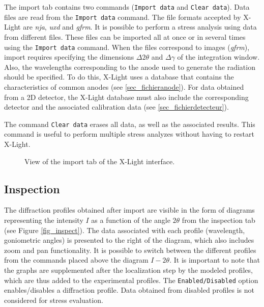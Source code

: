 \documentclass[french,a4paper]{report}
\begin{document}
The import tab contains two commands (\texttt{Import data} and \texttt{Clear data}). Data files are read from the \texttt{Import data} command. The file formats accepted by X-Light are \textit{nja}, \textit{uxd} and \textit{gfrm}. It is possible to perform a stress analysis using data from different files. These files can be imported all at once or in several times using the \texttt{Import data} command. When the files correspond to images (\textit{gfrm}), import requires specifying the dimensions $\Delta 2 \theta$ and $\Delta \gamma$ of the integration window. Also, the wavelengths corresponding to the anode used to generate the radiation should be specified. To do this, X-Light uses a database that contains the characteristics of common anodes (see \ref{sec_fichieranode}). For data obtained from a 2D detector, the X-Light database must also include the corresponding detector and the associated calibration data (see \ref{sec_fichierdetecteur}).

The command \texttt{Clear data} erases all data, as well as the associated results. This command is useful to perform multiple stress analyzes without having to restart X-Light.

\begin{figure}[h!]
\centering
{}
\caption{View of the import tab of the X-Light interface.}
\label{fig_import}
\end{figure}

\subsection{Inspection}

\label{sec_visualisation}

The diffraction profiles obtained after import are visible in the form of diagrams representing the intensity $I$ as a function of the angle $2\theta$ from the inspection tab (see Figure \ref{fig_inspect}). The data associated with each profile (wavelength, goniometric angles) is presented to the right of the diagram, which also includes zoom and pan functionality. It is possible to switch between the different profiles from the commands placed above the diagram $I-2\theta$. It is important to note that the graphs are supplemented after the localization step by the modeled profiles, which are thus added to the experimental profiles. The \texttt{Enabled/Disabled} option enables/disables a diffraction profile. Data obtained from disabled profiles is not considered for stress evaluation.
\end{document}
